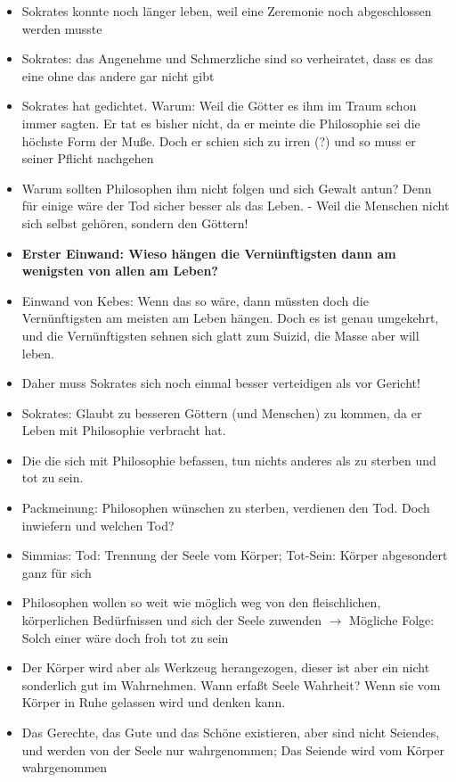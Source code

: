 \documentclass[emulatestandardclasses]{scrartcl}
\begin{document}
\begin{itemize}
  \item Sokrates konnte noch länger leben, weil eine Zeremonie noch abgeschlossen werden musste
  \item Sokrates: das Angenehme und Schmerzliche sind so verheiratet, dass es das eine ohne das andere gar nicht gibt
  \item Sokrates hat gedichtet. Warum: Weil die Götter es ihm im Traum schon immer sagten. Er tat es bisher nicht, da er meinte die Philosophie sei die höchste Form der Muße. Doch er schien sich zu irren (?) und so muss er seiner Pflicht nachgehen
  \item Warum sollten Philosophen ihm nicht folgen und sich Gewalt antun? Denn für einige wäre der Tod sicher besser als das Leben. - Weil die Menschen nicht sich selbst gehören, sondern den Göttern!
  \item \textbf{Erster Einwand: Wieso hängen die Vernünftigsten dann am wenigsten von allen am Leben?}
  \item Einwand von Kebes: Wenn das so wäre, dann müssten doch die Vernünftigsten am meisten am Leben hängen. Doch es ist genau umgekehrt, und die Vernünftigsten sehnen sich glatt zum Suizid, die Masse aber will leben.
  \item Daher muss Sokrates sich noch einmal besser verteidigen als vor Gericht!
  \item Sokrates: Glaubt zu besseren Göttern (und Menschen) zu kommen, da er Leben mit Philosophie verbracht hat.
  \item Die die sich mit Philosophie befassen, tun nichts anderes als zu sterben und tot zu sein.
  \item Packmeinung: Philosophen wünschen zu sterben, verdienen den Tod. Doch inwiefern und welchen Tod? 
  \item Simmias: Tod: Trennung der Seele vom Körper; Tot-Sein: Körper abgesondert ganz für sich
  \item Philosophen wollen so weit wie möglich weg von den fleischlichen, körperlichen Bedürfnissen und sich der Seele zuwenden $\rightarrow$ Mögliche Folge: Solch einer wäre doch froh tot zu sein
  \item Der Körper wird aber als Werkzeug herangezogen, dieser ist aber ein nicht sonderlich gut im Wahrnehmen. Wann erfaßt Seele Wahrheit? Wenn sie vom Körper in Ruhe gelassen wird und denken kann.
  \item Das Gerechte, das Gute und das Schöne existieren, aber sind nicht Seiendes, und werden von der Seele nur wahrgenommen; Das Seiende wird vom Körper wahrgenommen

\end{itemize}
\end{document}
